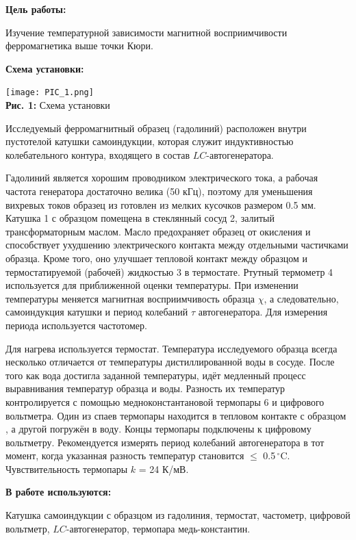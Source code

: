 \documentclass[12pt,a4paper]{scrartcl}
\begin{document}
	\textbf{Цель работы: }
	
	Изучение температурной зависимости магнитной восприимчивости ферромагнетика выше точки Кюри.
	
	\textbf{Схема установки:}
	\begin{center}
		\texttt{[image: PIC\_1.png]}
		\\\textbf{Рис. 1:} Схема установки
	\end{center}	
		
	Исследуемый ферромагнитный образец (гадолиний) расположен внутри пустотелой катушки самоиндукции, которая служит индуктивностью колебательного контура, входящего в состав $LC$-автогенератора.
	
	Гадолиний является хорошим проводником электрического тока, а рабочая частота генератора достаточно велика (50 кГц), поэтому для уменьшения вихревых токов образец из готовлен
	из мелких кусочков размером 0.5 мм. Катушка 1 с образцом помещена в стеклянный сосуд 2,
	залитый трансформаторным маслом. Масло предохраняет образец от окисления и способствует ухудшению электрического контакта между отдельными частичками образца. Кроме того,
	оно улучшает тепловой контакт между образцом и термостатируемой (рабочей) жидкостью 3 в
	термостате. Ртутный термометр 4 используется для приближенной оценки температуры. При
	изменении температуры меняется магнитная восприимчивость образца $\chi$, а следовательно, самоиндукция катушки и период колебаний $\tau$ автогенератора. Для измерения периода используется частотомер.
	
	Для нагрева используется термостат. Температура исследуемого образца всегда несколько
	отличается от температуры дистиллированной воды в сосуде. После того как вода достигла
	заданной температуры, идёт медленный процесс выравнивания температур образца и воды.
	Разность их температур контролируется с помощью медноконстантановой термопары 6 и цифрового вольтметра. Один из спаев термопары находится в тепловом контакте с образцом , а другой погружён в воду. Концы термопары подключены к цифровому вольтметру. Рекомендуется измерять период колебаний автогенератора в тот момент, когда указанная разность
	температур становится $\leqslant$ 0.5$\, ^\circ \mathrm{C}$. Чувствительность термопары $k$ = 24 К/мВ.
		
	\textbf{В работе используются:}
	
	Катушка самоиндукции с образцом из гадолиния, термостат, частометр, цифровой вольтметр, $LC$-автогенератор, термопара медь-константин.
	
	\newpage
	
\end{document}
